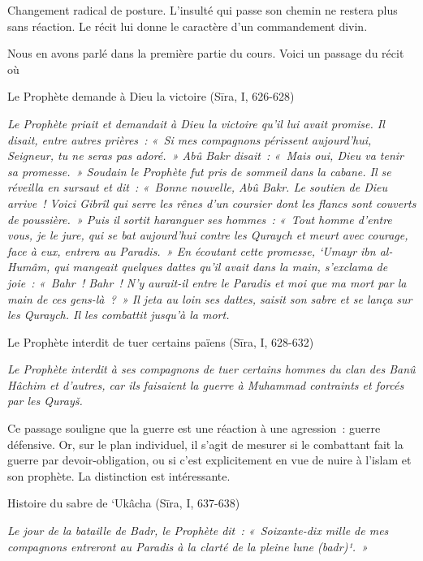 Changement radical de posture. L'insulté qui passe son chemin ne restera
plus sans réaction. Le récit lui donne le caractère d'un commandement
divin.


Nous en avons parlé dans la première partie du cours. Voici un passage
du récit où

Le Prophète demande à Dieu la victoire (Sīra, I, 626-628)

\emph{Le Prophète priait et demandait à Dieu la victoire qu'il lui avait
promise. Il disait, entre autres prières~: «~Si mes compagnons périssent
aujourd'hui, Seigneur, tu ne seras pas adoré.~» Abû Bakr disait~: «~Mais
oui, Dieu va tenir sa promesse.~» Soudain le Prophète fut pris de
sommeil dans la cabane. Il se réveilla en sursaut et dit~: «~Bonne
nouvelle, Abû Bakr. Le soutien de Dieu arrive~! Voici Gibrîl qui serre
les rênes d'un coursier dont les flancs sont couverts de poussière.~»
Puis il sortit haranguer ses hommes~: «~Tout homme d'entre vous, je le
jure, qui se bat aujourd'hui contre les Quraych et meurt avec courage,
face à eux, entrera au Paradis.~» En écoutant cette promesse, `Umayr ibn
al-Humâm, qui mangeait quelques dattes qu'il avait dans la main,
s'exclama de joie~: «~Bahr~! Bahr~! N'y aurait-il entre le Paradis et
moi que ma mort par la main de ces gens-là~?~» Il jeta au loin ses
dattes, saisit son sabre et se lança sur les Quraych. Il les combattit
jusqu'à la mort.}

Le Prophète interdit de tuer certains païens (Sīra, I, 628-632)

\emph{Le Prophète interdit à ses compagnons de tuer certains hommes du
clan des Banû Hâchim et d'autres, car ils faisaient la guerre à Muhammad
contraints et forcés par les Qurayš.}

Ce passage souligne que la guerre est une réaction à une agression~:
guerre défensive. Or, sur le plan individuel, il s'agit de mesurer si le
combattant fait la guerre par devoir-obligation, ou si c'est
explicitement en vue de nuire à l'islam et son prophète. La distinction
est intéressante.

Histoire du sabre de `Ukâcha (Sīra, I, 637-638)

\emph{Le jour de la bataille de Badr, le Prophète dit~: «~Soixante-dix
mille de mes compagnons entreront au Paradis à la clarté de la pleine
lune (badr)¹.~»}


